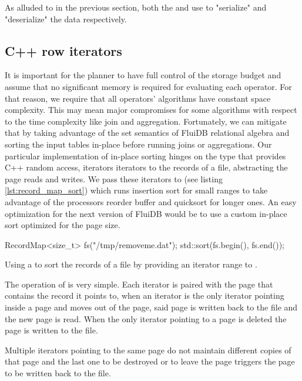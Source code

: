 As alluded to in the previous section, both the  and 
use  to "serialize" and "deserialize" the data
respectively.

\subsection{C++ row iterators}

It is important for the planner to have full control of the storage
budget and assume that no significant memory is required for
evaluating each operator. For that reason, we require that all
operators' algorithms have constant space complexity. This may mean
major compromises for some algorithms with respect to the time
complexity like join and aggregation. Fortunately, we can mitigate that
by taking advantage of the set semantics of FluiDB relational algebra
and sorting the input tables in-place before running joins or
aggregations. Our particular implementation of in-place sorting hinges
on the  type that provides C++ random access, iterators
iterators to the records of a file, abstracting the page reads and
writes. We pass these iterators to  (see listing
\ref{lst:record_map_sort}) which runs insertion sort for small ranges
to take advantage of the processors reorder buffer and quicksort for
longer ones. An easy optimization for the next version of FluiDB would
be to use a custom in-place sort optimized for the page size.

\begin{code}
\begin{cppcode}
RecordMap<size_t> fs("/tmp/removeme.dat");
std::sort(fs.begin(), fs.end());
\end{cppcode}
  \caption{\label{lst:record_map_sort}Using a  to sort
    the records of a file by providing an iterator range to .}
\end{code}

The operation of  is very simple. Each iterator is paired
with the page that contains the record it points to, when an iterator
is the only iterator pointing inside a page and moves
out of the page, said page is
written back to the file and the new page is read. When the only
iterator pointing to a page is deleted the page is written to the
file. 

Multiple iterators pointing to the same page do not
maintain different copies of that page and the last one to be
destroyed or to leave the page triggers the page to be written back to
the file.

